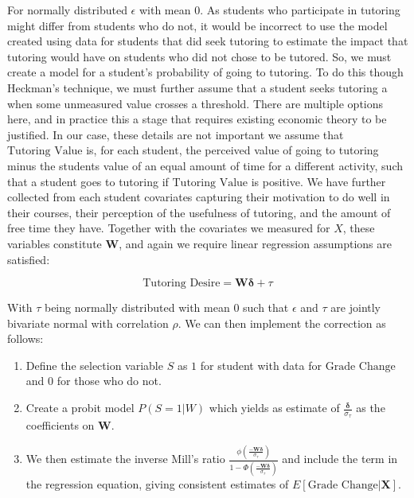 \documentclass[12pt,twoside]{reedthesis}
\theoremstyle{definition}
\begin{document}
For normally distributed $\epsilon$ with mean $0$. As students who participate in tutoring might differ from students who do not, it would be incorrect to use the model created using data for students that did seek tutoring to estimate the impact that tutoring would have on students who did not chose to be tutored. So, we must create a model for a student's probability of going to tutoring. To do this though Heckman's technique, we must further assume that a student seeks tutoring a when some unmeasured value crosses a threshold. There are multiple options here, and in practice this a stage that requires existing economic theory to be justified. In our case, these details are not important we assume that $\text{Tutoring Value}$ is, for each student, the perceived value of going to tutoring minus the students value of an equal amount of time for a different activity, such that a student goes to tutoring if  $\text{Tutoring Value}$ is positive. We have further collected from each student covariates capturing their motivation to do well in their courses, their perception of the usefulness of tutoring, and the amount of free time they have. Together with the covariates we measured for $X$, these variables constitute $\mathbf{\mathbf{W}}$,  and again we require linear regression assumptions are satisfied:

$$\text{Tutoring Desire} = \mathbf{W}  \boldsymbol{\delta} + \tau$$

With $\tau$ being normally distributed with mean $0$ such that $\epsilon$ and $\tau$ are jointly bivariate normal with correlation $\rho$. We can then implement the correction as follows:

\begin{enumerate}
\item Define the selection variable $S$ as $1$ for student with data for $\text{Grade Change}$ and $0$ for those who do not.

\item Create a probit model $P(S=1 | W)$ which yields as estimate of $\frac{\boldsymbol{\delta}}{\sigma_\tau}$ as the coefficients on $\mathbf{W}$.

\item We then estimate the inverse Mill's ratio $\frac{\phi(\frac{-\mathbf{W} \boldsymbol{\delta}}{\sigma_\tau})}{1 - \Phi(\frac{-\mathbf{W} \boldsymbol{\delta}}{\sigma_\tau})}$ and include the term in the regression equation, giving consistent estimates of $E[\text{Grade Change} | \mathbf{X}]$.
\end{enumerate}
\end{document}
